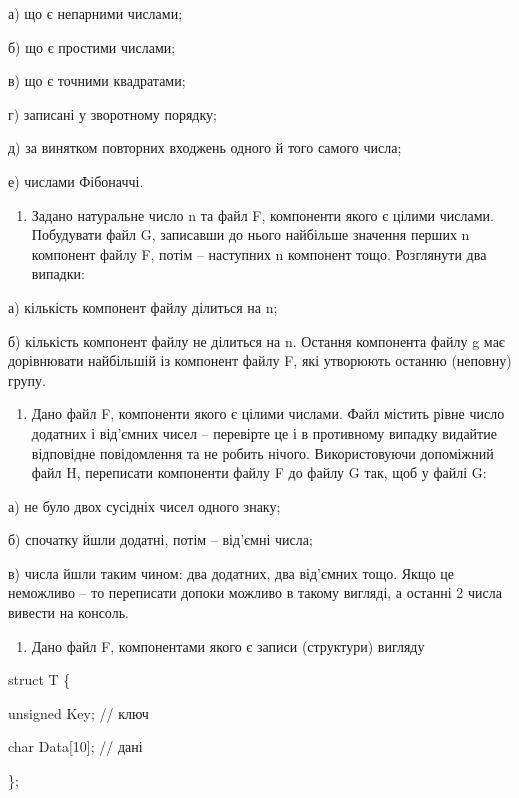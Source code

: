 \documentclass[]{article}
\begin{document}
а) що є непарними числами;

б) що є простими числами;

в) що є точними квадратами;

г) записані у зворотному порядку;

д) за винятком повторних входжень одного й того самого числа;

е) числами Фібоначчі.

\begin{enumerate}
\def\labelenumi{\arabic{enumi})}
\item
  Задано натуральне число n та файл F, компоненти якого є цілими
  числами. Побудувати файл G, записавши до нього найбільше значення
  перших n компонент файлу F, потім -- наступних n компонент тощо.
  Розглянути два випадки:
\end{enumerate}

а) кількість компонент файлу ділиться на n;

б) кількість компонент файлу не ділиться на n. Остання компонента файлу
g має дорівнювати найбільшій із компонент файлу F, які утворюють останню
(неповну) групу.

\begin{enumerate}
\def\labelenumi{\arabic{enumi})}
\item
  Дано файл F, компоненти якого є цілими числами. Файл містить рівне
  число додатних і від'ємних чисел -- перевірте це і в противному
  випадку видайтие відповідне повідомлення та не робить нічого.
  Використовуючи допоміжний файл H, переписати компоненти файлу F до
  файлу G так, щоб у файлі G:
\end{enumerate}

а) не було двох сусідніх чисел одного знаку;

б) спочатку йшли додатні, потім -- від'ємні числа;

в) числа йшли таким чином: два додатних, два від'ємних тощо. Якщо це
неможливо -- то переписати допоки можливо в такому вигляді, а останні 2
числа вивести на консоль.

\begin{enumerate}
\def\labelenumi{\arabic{enumi})}
\item
  Дано файл F, компонентами якого є записи (структури) вигляду
\end{enumerate}

struct T \{

unsigned Key; // ключ

char Data{[}10{]}; // дані

\};
\end{document}
